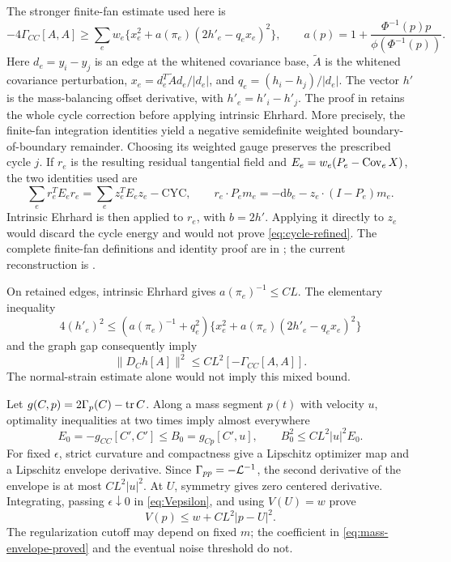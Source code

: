 The stronger finite-fan estimate used here is
\begin{equation}\label{eq:cycle-refined}
 -4\Gamma_{CC}[A,A]\ge
 \sum_e w_e\{x_e^2+a(\pi_e)(2h'_e-q_ex_e)^2\},\qquad
 a(p)=1+\frac{\Phi^{-1}(p)p}{\phi(\Phi^{-1}(p))}.
\end{equation}
Here $d_e=y_i-y_j$ is an edge at the whitened covariance base,
$\widetilde A$ is the whitened covariance perturbation,
$x_e=d_e^T\widetilde A d_e/|d_e|$, and
$q_e=(h_i-h_j)/|d_e|$. The vector $h'$ is the mass-balancing offset
derivative, with $h'_e=h'_i-h'_j$. The proof in \cite{cycle} retains
the whole cycle correction before applying intrinsic Ehrhard. More
precisely, the finite-fan integration identities yield a negative
semidefinite weighted boundary-of-boundary remainder. Choosing its
weighted gauge preserves the prescribed cycle $j$. If $r_e$ is the
resulting residual tangential field and
$E_e=w_e(P_e-\operatorname{Cov}_e X)$, the two identities used are
\[
 \sum_e r_e^TE_er_e=\sum_e z_e^TE_ez_e-\mathrm{CYC},
 \qquad r_e\cdot P_em_e=-\mathrm db_e-z_e\cdot(I-P_e)m_e.
\]
Intrinsic Ehrhard is then applied to $r_e$, with $b=2h'$. Applying it
directly to $z_e$ would discard the cycle energy and would not prove
\eqref{eq:cycle-refined}. The complete finite-fan definitions and identity
proof are in \cite[Sections 3--5]{cycle}; the current reconstruction is
\cite[Section 2b]{currentassembly}.

On retained edges, intrinsic Ehrhard gives $a(\pi_e)^{-1}\le CL$.
The elementary inequality
\[
 4(h'_e)^2\le(a(\pi_e)^{-1}+q_e^2)
       \{x_e^2+a(\pi_e)(2h'_e-q_ex_e)^2\}
\]
and the graph gap consequently imply
\begin{equation}\label{eq:mixed-offset}
 \|D_Ch[A]\|^2\le CL^2[-\Gamma_{CC}[A,A]].
\end{equation}
The normal-strain estimate alone would not imply this mixed bound.

Let $g(C,p)=2\Gamma_p(C)-\operatorname{tr} C$. Along a mass segment $p(t)$ with
velocity $u$, optimality inequalities at two times imply almost everywhere
\[
 E_0=-g_{CC}[C',C']\le B_0=g_{Cp}[C',u],\qquad
 B_0^2\le CL^2|u|^2E_0.
\]
For fixed $\epsilon$, strict curvature and compactness give a Lipschitz
optimizer map and a Lipschitz envelope derivative. Since
$\Gamma_{pp}=-\mathcal L^{-1}$, the second derivative of the envelope is at
most $CL^2|u|^2$. At $U$, symmetry gives zero centered derivative.
Integrating, passing $\epsilon\downarrow0$ in \eqref{eq:Vepsilon}, and
using $V(U)=w$ prove
\begin{equation}\label{eq:mass-envelope-proved}
                  V(p)\le w+CL^2|p-U|^2.
\end{equation}
The regularization cutoff may depend on fixed $m$; the coefficient in
\eqref{eq:mass-envelope-proved} and the eventual noise threshold do not.

